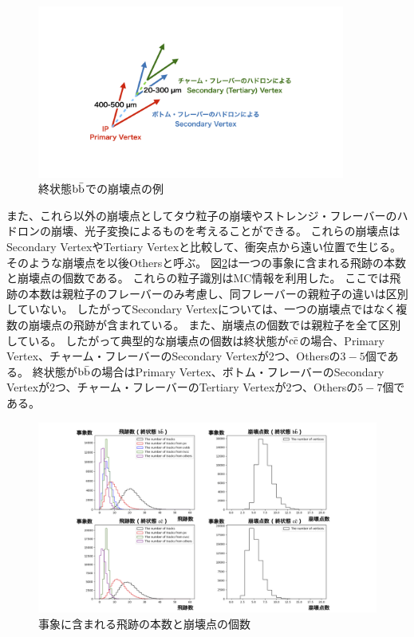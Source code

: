 \begin{figure}[htbp]
 \centering
 \includegraphics[trim = 200 150 200 150, width=0.9\textwidth, clip]{Figure/3Networks/3-1-1-1FinalStateBB.png}
 \caption{終状態$\rm b\bar{b}$での崩壊点の例}
 \label{3-1-1-1FinalStateBB}
\end{figure}

また、これら以外の崩壊点としてタウ粒子の崩壊やストレンジ・フレーバーのハドロンの崩壊、光子変換によるものを考えることができる。
これらの崩壊点はSecondary VertexやTertiary Vertexと比較して、衝突点から遠い位置で生じる。
そのような崩壊点を以後Othersと呼ぶ。
図\ref{3-1-1-2TracksandVertices}は一つの事象に含まれる飛跡の本数と崩壊点の個数である。
これらの粒子識別はMC情報を利用した。
ここでは飛跡の本数は親粒子のフレーバーのみ考慮し、同フレーバーの親粒子の違いは区別していない。
したがってSecondary Vertexについては、一つの崩壊点ではなく複数の崩壊点の飛跡が含まれている。
また、崩壊点の個数では親粒子を全て区別している。
したがって典型的な崩壊点の個数は終状態が$\rm c\bar{c}$の場合、Primary Vertex、チャーム・フレーバーのSecondary Vertexが2つ、Othersの$3-5$個である。
終状態が$\rm b\bar{b}$の場合はPrimary Vertex、ボトム・フレーバーのSecondary Vertexが2つ、チャーム・フレーバーのTertiary Vertexが2つ、Othersの$5-7$個である。

\begin{figure}[htbp]
 \centering
 \includegraphics[trim = 150 0 150 0, width=1.0\textwidth, clip]{Figure/3Networks/3-1-1-2TracksandVertices.png}
 \caption{事象に含まれる飛跡の本数と崩壊点の個数}
 \label{3-1-1-2TracksandVertices}
\end{figure}

